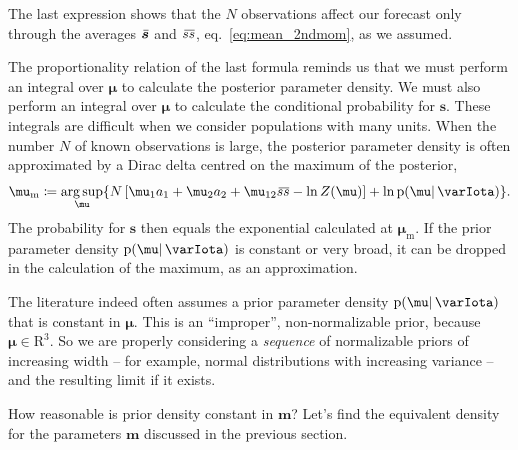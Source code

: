 \documentclass[\ifafour a4paper,12pt,\else a5paper,10pt,\fi%
onecolumn,oneside,article,%
british%
]{memoir}
\theoremstyle{remark}
\theoremstyle{innote}
\newcommand*{\RR}{\bm{\mathrm{R}}}
\newcommand*{\defd}{\coloneqq}
\newcommand*{\pf}{\mathrm{p}}%
\renewcommand*{\|}{\mathpunct{|}}
\newcommand*{\eqn}{eq.}%
\newcommand*{\widebar}[1]{{\mkern1.5mu\skew{2}\overline{\mkern-1.5mu#1\mkern-1.5mu}\mkern 1.5mu}}
\DeclareMathOperator*{\argsup}{arg\,sup}
\newcommand*{\yI}{\varIota}
\newcommand*{\ys}{\bm{s}}
\newcommand*{\la}{\mu_{12}}
\newcommand*{\yth}{\bm{\mu}}
\newcommand*{\ythm}{\yth_{\text{m}}}
\newcommand*{\yt}{\bm{m}}
\newcommand*{\yav}{\widebar{\ys}}
\newcommand*{\ycv}{\widebar{ss}}
\begin{document}
The last expression shows that the $N$ observations affect our forecast
only through the averages $\yav$ and $\ycv$, \eqn~\eqref{eq:mean_2ndmom},
as we assumed.

The proportionality relation of the last formula reminds us that we must
perform an integral over $\yth$ to calculate the posterior parameter
density. We must also perform an integral over $\yth$ to calculate the
conditional probability for $\ys$. These integrals are difficult when we
consider populations with many units. When the number $N$ of known
observations is large, the posterior parameter density is often
approximated by a Dirac delta centred on the maximum of the posterior,
\begin{equation}
  \label{eq:max_posterior}
  \ythm \defd \argsup_{\yth}
  \{N\,[\mu_1 a_1 + \mu_2 a_2 + \la \ycv -\ln Z(\yth)]+
  \ln \pf(\yth \|\yI) \}.
\end{equation}
The probability for $\ys$ then equals the exponential calculated at
$\ythm$. If the prior parameter density $\pf(\yth \|\yI)$ is constant or
very broad, it can be dropped in the calculation of the maximum, as an
approximation.

The literature indeed often assumes a prior parameter density $\pf(\yth \|\yI)$
that is constant in $\yth$. This is an \enquote{improper}, non-normalizable
prior, because $\yth \in \RR^3$. So we are properly considering a
\emph{sequence} of normalizable priors of increasing width -- for example,
normal distributions with increasing variance -- and the resulting limit if
it exists.

How reasonable is prior density constant in $\yt$? Let's find the
equivalent density for the parameters $\yt$ discussed in the previous
section.
\end{document}
